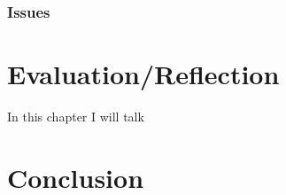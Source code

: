 \documentclass[bsc,frontabs,twoside,singlespacing,parskip,deptreport]{infthesis}     %
\begin{document}
\subsection{Issues}

\chapter{Evaluation/Reflection}
	In this chapter I will talk

\chapter{Conclusion}






\end{document}
